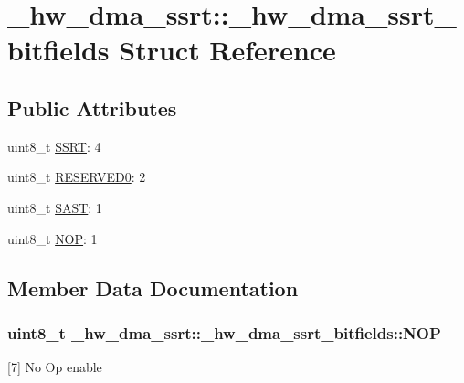 \hypertarget{struct__hw__dma__ssrt_1_1__hw__dma__ssrt__bitfields}{}\section{\+\_\+hw\+\_\+dma\+\_\+ssrt\+:\+:\+\_\+hw\+\_\+dma\+\_\+ssrt\+\_\+bitfields Struct Reference}
\label{struct__hw__dma__ssrt_1_1__hw__dma__ssrt__bitfields}
\subsection*{Public Attributes}
\begin{DoxyCompactItemize}
\item 
uint8\+\_\+t \hyperlink{struct__hw__dma__ssrt_1_1__hw__dma__ssrt__bitfields_ab7c33200e4f0caa44ec81cf08d269dca}{S\+S\+RT}\+: 4
\item 
uint8\+\_\+t \hyperlink{struct__hw__dma__ssrt_1_1__hw__dma__ssrt__bitfields_a5e66bf3464442a11762bd8c9379f2223}{R\+E\+S\+E\+R\+V\+E\+D0}\+: 2
\item 
uint8\+\_\+t \hyperlink{struct__hw__dma__ssrt_1_1__hw__dma__ssrt__bitfields_a8bc83d3fb28f60b95f5ba7dcb5b6f614}{S\+A\+ST}\+: 1
\item 
uint8\+\_\+t \hyperlink{struct__hw__dma__ssrt_1_1__hw__dma__ssrt__bitfields_a1d6f86880a12c56b96c63d6b9e7d9ee4}{N\+OP}\+: 1
\end{DoxyCompactItemize}


\subsection{Member Data Documentation}
\subsubsection[{\texorpdfstring{N\+OP}{NOP}}]{\setlength{\rightskip}{0pt plus 5cm}uint8\+\_\+t \+\_\+hw\+\_\+dma\+\_\+ssrt\+::\+\_\+hw\+\_\+dma\+\_\+ssrt\+\_\+bitfields\+::\+N\+OP}\hypertarget{struct__hw__dma__ssrt_1_1__hw__dma__ssrt__bitfields_a1d6f86880a12c56b96c63d6b9e7d9ee4}{}\label{struct__hw__dma__ssrt_1_1__hw__dma__ssrt__bitfields_a1d6f86880a12c56b96c63d6b9e7d9ee4}
\mbox{[}7\mbox{]} No Op enable 
